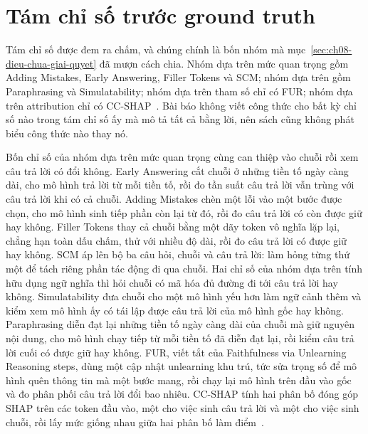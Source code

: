 \section{Tám chỉ số trước ground truth}
\label{sec:ch09-ket-qua}

%
%
Tám chỉ số được đem ra chấm, và chúng chính là bốn nhóm mà
mục~\ref{sec:ch08-dieu-chua-giai-quyet} đã mượn cách chia. Nhóm dựa trên mức
quan trọng gồm Adding Mistakes, Early Answering, Filler Tokens và SCM; nhóm dựa
trên  gồm Paraphrasing và
Simulatability; nhóm dựa trên
tham số chỉ có FUR; nhóm dựa trên attribution chỉ có
CC-SHAP~\autocite{p21metrics}. Bài báo không viết công thức cho bất kỳ chỉ số
nào trong tám chỉ số ấy mà mô tả tất cả bằng lời, nên sách cũng không phát biểu
công thức nào thay nó.

Bốn chỉ số của nhóm dựa trên mức quan trọng cùng can thiệp vào chuỗi rồi xem
câu trả lời có đổi không. Early Answering cắt chuỗi ở những tiền tố ngày càng
dài, cho mô hình trả lời từ mỗi tiền tố, rồi đo tần suất câu trả lời vẫn trùng
với câu trả lời khi có cả chuỗi. Adding Mistakes chèn một lỗi vào một bước
được chọn, cho mô hình sinh tiếp phần còn lại từ đó, rồi đo câu trả lời có còn
được giữ hay không. Filler Tokens thay cả chuỗi bằng một dãy token vô nghĩa
lặp lại, chẳng hạn toàn dấu chấm, thử với nhiều độ dài, rồi đo câu trả lời có
được giữ hay không. SCM áp 
lên bộ ba câu hỏi,
chuỗi và câu trả lời: làm hỏng từng thứ một để tách riêng phần tác động đi qua
chuỗi. Hai chỉ số của nhóm dựa trên tính hữu dụng ngữ nghĩa thì hỏi chuỗi có
mã hóa đủ đường đi tới câu trả lời hay không. Simulatability đưa chuỗi cho một mô hình yếu hơn làm
ngữ cảnh thêm và kiểm xem mô hình ấy có tái lập được câu trả lời của mô hình
gốc hay không. Paraphrasing diễn đạt lại những tiền tố ngày càng dài của chuỗi
mà giữ nguyên nội dung, cho mô hình chạy tiếp từ mỗi tiền tố đã diễn đạt lại,
rồi kiểm câu trả lời cuối có được giữ hay không. FUR, viết tắt của Faithfulness
via Unlearning Reasoning steps, dùng một cập nhật unlearning khu trú, tức sửa
trọng số để mô hình quên thông tin mà một bước mang, rồi chạy lại mô hình trên
đầu vào gốc và đo phân phối câu trả lời đổi bao nhiêu. CC-SHAP tính hai phân
bố đóng góp SHAP trên các token đầu vào, một cho việc sinh câu trả lời và một
cho việc sinh chuỗi, rồi lấy mức giống nhau giữa hai phân bố làm
điểm~\autocite{p21metrics}.

